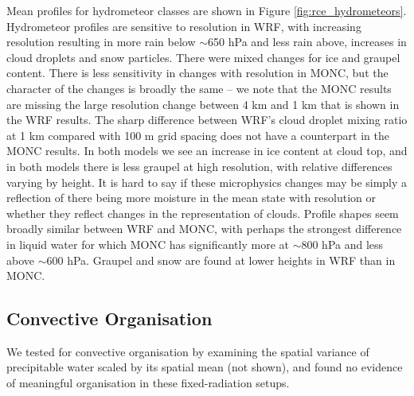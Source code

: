\documentclass[draft]{agujournal2019}
\newcommand{\todo}[1]{\textcolor{red}{\textbf{(#1)}}}
\begin{document}

Mean profiles for hydrometeor classes are shown in Figure
\ref{fig:rce_hydrometeors}. Hydrometeor profiles are sensitive to resolution in
WRF, with increasing resolution resulting in more rain below $\sim$650 hPa and
less rain above, increases in cloud droplets and snow particles. There were
mixed changes for ice and graupel content. There is less sensitivity in changes
with resolution in MONC, but the character of the changes is broadly the same --
we note that the MONC results are missing the large resolution change between 4
km and 1 km that is shown in the WRF results. The sharp difference between WRF's
cloud droplet mixing ratio at 1 km compared with 100 m grid spacing does not
have a counterpart in the MONC results. In both models we see an increase in ice
content at cloud top, and in both models there is less graupel at high
resolution, with relative differences varying by height. It is hard to say if
these microphysics changes may be simply a reflection of there being more
moisture in the mean state with resolution or whether they reflect changes in
the representation of clouds. Profile shapes seem broadly similar between WRF
and MONC, with perhaps the strongest difference in liquid water for which MONC
has significantly more at $\sim$800 hPa and less above $\sim$600 hPa. Graupel
and snow are found at lower heights in WRF than in MONC.


\subsection{Convective Organisation}

We tested for convective organisation by examining the spatial variance of
precipitable water scaled by its spatial mean (not shown), and found no evidence
of meaningful organisation in these fixed-radiation setups.
\end{document}
